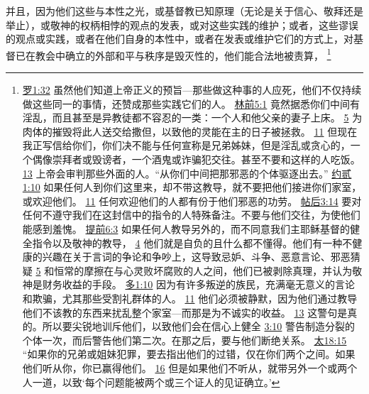\documentclass[12pt, a4paper, oneside]{ctexart}
\begin{document}
	并且，因为他们这些与本性之光，或基督教已知原理（无论是关于信心、敬拜还是举止），或敬神的权柄相悖的观点的发表，或对这些实践的维护；或者，这些谬误的观点或实践，或者在他们自身的本性中，或者在发表或维护它们的方式上，对基督已在教会中确立的外部和平与秩序是毁灭性的，他们能合法地被责算，
	\footnote {
		\href{https://biblehub.com/romans/1-32.htm}{罗1:32} 虽然他们知道上帝正义的预旨---那些做这种事的人应死，他们不仅持续做这些同一的事情，还赞成那些实践它们的人。
		\href{https://biblehub.com/1_corinthians/5-1.htm}{林前5:1} 竟然据悉你们中间有淫乱，而且甚至是异教徒都不容忍的一类：一个人和他父亲的妻子上床。
		\href{https://biblehub.com/1_corinthians/5-5.htm}{5} 为肉体的摧毁将此人送交给撒但，以致他的灵能在主的日子被拯救。
		\href{https://biblehub.com/1_corinthians/5-11.htm}{11} 但现在我正写信给你们，你们决不能与任何宣称是兄弟姊妹，但是淫乱或贪心的，一个偶像崇拜者或毁谤者，一个酒鬼或诈骗犯交往。甚至不要和这样的人吃饭。
		\href{https://biblehub.com/1_corinthians/5-13.htm}{13} 上帝会审判那些外面的人。“从你们中间把那邪恶的个体驱逐出去。”
		\href{https://biblehub.com/2_john/1-10.htm}{约贰1:10} 如果任何人到你们这里来，却不带这教导，就不要把他们接进你们家室，或欢迎他们。
		\href{https://biblehub.com/2_john/1-11.htm}{11} 任何欢迎他们的人都有份于他们邪恶的功劳。
		\href{https://biblehub.com/2_thessalonians/3-14.htm}{帖后3:14} 要对任何不遵守我们在这封信中的指令的人特殊备注。不要与他们交往，为使他们能感到羞愧。
		\href{https://biblehub.com/1_timothy/6-3.htm}{提前6:3} 如果任何人教导另外的，而不同意我们主耶稣基督的健全指令以及敬神的教导，
		\href{https://biblehub.com/1_timothy/6-4.htm}{4} 他们就是自负的且什么都不懂得。他们有一种不健康的兴趣在关于言词的争论和争吵上，这导致忌妒、斗争、恶意言论、邪恶猜疑
		\href{https://biblehub.com/1_timothy/6-5.htm}{5} 和恒常的摩擦在与心灵败坏腐败的人之间，他们已被剥除真理，并认为敬神是财务收益的手段。
		\href{https://biblehub.com/titus/1-10.htm}{多1:10} 因为有许多叛逆的族民，充满毫无意义的言论和欺骗，尤其那些受割礼群体的人。
		\href{https://biblehub.com/titus/1-11.htm}{11} 他们必须被静默，因为他们通过教导他们不该教的东西来扰乱整个家室---而那是为不诚实的收益。
		\href{https://biblehub.com/titus/1-13.htm}{13} 这警句是真的。所以要尖锐地训斥他们，以致他们会在信心上健全
		\href{https://biblehub.com/titus/3-10.htm}{3:10} 警告制造分裂的个体一次，而后警告他们第二次。在那之后，要与他们断绝关系。
		\href{https://biblehub.com/matthew/18-15.htm}{太18:15} “如果你的兄弟或姐妹犯罪，要去指出他们的过错，仅在你们两个之间。如果他们听从你，你已赢得他们。
		\href{https://biblehub.com/matthew/18-16.htm}{16} 但是如果他们不听从，就带另外一个或两个人一道，以致‘每个问题能被两个或三个证人的见证确立。’
}
\end{document}
